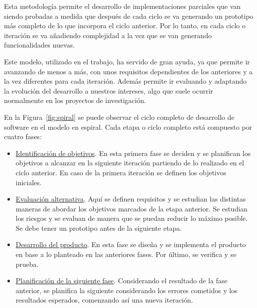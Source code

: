 Esta metodología permite el desarrollo de implementaciones parciales que van siendo probadas a medida que después de cada ciclo se va generando un prototipo más completo de lo que incorpora el ciclo anterior. Por lo tanto, en cada ciclo o iteración se va añadiendo complejidad a la vez que se van generando funcionalidades nuevas.

Este modelo, utilizado en el trabajo, ha servido de gran ayuda, ya que permite ir avanzando de menos a más, con unos requisitos dependientes de los anteriores y a la vez diferentes para cada iteración. Además permite ir evaluando y adaptando la evolución del desarrollo a nuestros intereses, algo que suele ocurrir normalmente en los proyectos de investigación.

En la Figura~\ref{fig:spiral} se puede observar el ciclo completo de desarrollo de software en el modelo en espiral. Cada etapa o ciclo completo está compuesto por cuatro fases:

\begin{itemize}
\item \underline{Identificación de objetivos}. En esta primera fase se deciden y se planifican los objetivos a alcanzar en la siguiente iteración partiendo de lo realizado en el ciclo anterior. En caso de la primera iteración se definen los objetivos iniciales.

\item \underline{Evaluación alternativa}. Aquí se definen requisitos y se estudian las distintas maneras de abordar los objetivos marcados de la etapa anterior. Se estudian los riesgos y se evaluan de manera que se puedan reducir lo máximo posible. Se debe tener un prototipo antes de la siguiente etapa.

\item \underline{Desarrollo del producto}. En esta fase se diseña y se implementa el producto en base a lo planteado en las anteriores fases. Por último, se verifica y se prueba.

\item \underline{Planificación de la siguiente fase}. Considerando el resultado de la fase anterior, se planifica la siguiente considerando los errores cometidos y los resultados esperados, comenzando así una nueva iteración.

\end{itemize}

